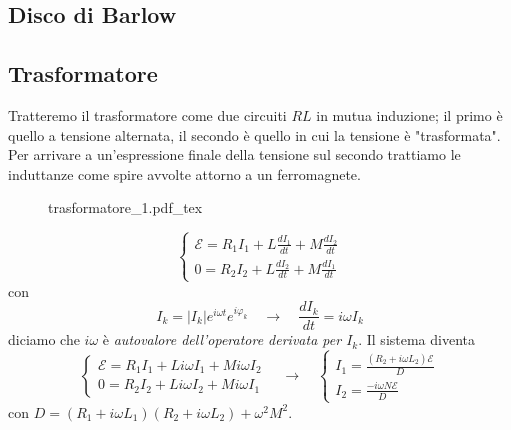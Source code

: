 \documentclass[x11names]{report}
\newcommand{\incfig}[1]{%
	{#1.pdf_tex}
}
\begin{document}
\subsection{Disco di Barlow}
\subsection{Trasformatore}
Tratteremo il trasformatore come due circuiti \(RL\) in mutua induzione; il primo è quello a tensione alternata, il secondo è quello in cui la tensione è "trasformata". Per arrivare a un'espressione finale della tensione sul secondo trattiamo le induttanze come spire avvolte attorno a un ferromagnete.

\begin{figure}[H]
	\centering
	\incfig{trasformatore_1}
\end{figure}
\[
	\begin{cases}
		\mathcal{E} = R_1I_1 + L\frac{dI_1}{dt} + M\frac{dI_2}{dt} \\
		0 = R_2I_2 + L\frac{dI_2}{dt} + M\frac{dI_1}{dt}
	\end{cases}
\]
con 
\[
I_k = |I_k|e^{i\omega t}e^{i\varphi_k} \quad \to \quad \frac{dI_k}{dt} = i\omega I_k
\]
diciamo che \(i\omega\) è \textit{autovalore dell'operatore derivata per \(I_k\)}. Il sistema diventa
\[
	\begin{cases}
		\mathcal{E} = R_1I_1 + Li\omega I_1 + Mi\omega I_2 \\
		0 = R_2I_2 + Li\omega I_2 + Mi\omega I_1
	\end{cases} \quad \to \quad 
	\begin{cases}
		I_1 = \frac{(R_2 + i\omega L_2)\mathcal{E}}{D} \\
		I_2 = \frac{-i\omega N\mathcal{E}}{D} 
	\end{cases}
\]
con \(D = (R_1 + i\omega L_1)(R_2 +i \omega L_2) + \omega^2M^2\). \\
\end{document}
